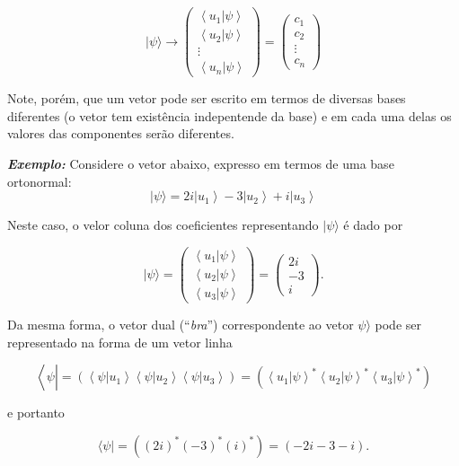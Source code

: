 \documentclass[11pt]{article}
\begin{document}
\[
| \psi \rangle \rightarrow\left( \begin{array}{c} \left\langle u_{1} | \psi\right\rangle \\ \left\langle u_{2} | \psi\right\rangle \\ \vdots \\ \left\langle u_{n} | \psi\right\rangle \end{array} \right) = 
\left(\begin{array}{c} c_{1} \\ c_{2} \\ \vdots \\ c_{n} \end{array}\right)
\]

Note, porém, que um vetor pode ser escrito em termos de diversas bases
diferentes (o vetor tem existência indepentende da base) e em cada uma
delas os valores das componentes serão diferentes.

\textbf{\emph{Exemplo:}} Considere o vetor abaixo, expresso em termos de
uma base ortonormal:
\[ |\psi\rangle=2 i\left|u_{1}\right\rangle-3\left|u_{2}\right\rangle+i\left|u_{3}\right\rangle\]

    Neste caso, o velor coluna dos coeficientes representando
\(|\psi\rangle\) é dado por

\[
|\psi\rangle = 
\left( \begin{array}{c} \left\langle u_{1} | \psi\right\rangle \\ \left\langle u_{2} | \psi\right\rangle \\ \left\langle u_{3} |\psi\right\rangle \end{array}\right) = 
\left( \begin{array}{c} 2 i \\ -3 \\ i \end{array} \right).
\]

Da mesma forma, o vetor dual (``\emph{bra}'') correspondente ao vetor
\(\psi\rangle\) pode ser representado na forma de um vetor linha

\[
\left\langle\psi\left|=\left(\left\langle\psi | u_{1}\right\rangle\left\langle\psi | u_{2}\right\rangle\left\langle\psi | u_{3}\right\rangle\right)=\left(\left\langle u_{1} | \psi\right\rangle^{*}\left\langle u_{2} | \psi\right\rangle^{*}\left\langle u_{3} | \psi\right\rangle^{*}\right)\right.\right.
\]

e portanto

\[
\langle\psi|=\left((2 i)^{*}(-3)^{*}(i)^{*}\right)=(-2 i-3-i).
\]
\end{document}
